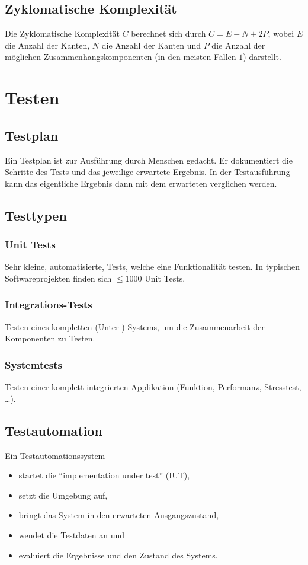 \documentclass[a4paper, 11pt, accentcolor = tud3b]{tudreport}
\begin{document}
			\subsection{Zyklomatische Komplexität}
				Die Zyklomatische Komplexität $ C $ berechnet sich durch $ C = E - N + 2P $, wobei $ E $ die Anzahl der Kanten, $ N $ die Anzahl der Kanten und $ P $ die Anzahl der möglichen Zusammenhangskomponenten (in den meisten Fällen $ 1 $) darstellt.
		
		\section{Testen}
			\subsection{Testplan}
				Ein Testplan ist zur Ausführung durch Menschen gedacht. Er dokumentiert die Schritte des Tests und das jeweilige erwartete Ergebnis. In der Testausführung kann das eigentliche Ergebnis dann mit dem erwarteten verglichen werden.
		
			\subsection{Testtypen}
				\subsubsection{Unit Tests}
					Sehr kleine, automatisierte, Tests, welche eine Funktionalität testen. In typischen Softwareprojekten finden sich $ \leq 1000 $ Unit Tests.
				
				\subsubsection{Integrations-Tests}
					Testen eines kompletten (Unter-) Systems, um die Zusammenarbeit der Komponenten zu Testen.
				
				\subsubsection{Systemtests}
					Testen einer komplett integrierten Applikation (Funktion, Performanz, Stresstest, \dots).
			
			\subsection{Testautomation}
				Ein Testautomationssystem
				\begin{itemize}
					\item startet die \enquote{implementation under test} (IUT),
					\item setzt die Umgebung auf,
					\item bringt das System in den erwarteten Ausgangszustand,
					\item wendet die Testdaten an und
					\item evaluiert die Ergebnisse und den Zustand des Systems.
				\end{itemize}
			
\end{document}
